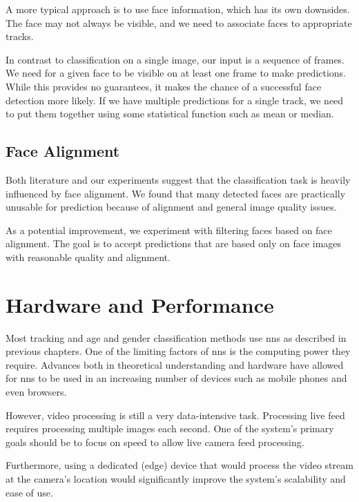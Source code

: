 A more typical approach is to use face information\cite{levi2015age, yang2018ssr, karkkainenfairface}, which has its own downsides. The face may not always be visible, and we need to associate faces to appropriate tracks.

In contrast to classification on a single image, our input is a sequence of frames. We need for a given face to be visible on at least one frame to make predictions. While this provides no guarantees, it makes the chance of a successful face detection more likely. If we have multiple predictions for a single track, we need to put them together using some statistical function such as mean or median.

\subsection{Face Alignment}

Both literature\cite{karkkainenfairface} and our experiments suggest that the classification task is heavily influenced by face alignment. We found that many detected faces are practically unusable for prediction because of alignment and general image quality issues.

As a potential improvement, we experiment with filtering faces based on face alignment. The goal is to accept predictions that are based only on face images with reasonable quality and alignment.

\section{Hardware and Performance}

Most tracking and age and gender classification methods use \glspl{nn} as described in previous chapters. One of the limiting factors of \glspl{nn} is the computing power they require\cite{MOT16, yolo}.  Advances both in theoretical understanding and hardware have allowed for \glspl{nn} to be used in an increasing number of devices such as mobile phones\cite{mobilenets} and even browsers\cite{tfjs}.

However, video processing is still a very data-intensive task. Processing live feed requires processing multiple images each second. One of the system's primary goals should be to focus on speed to allow live camera feed processing.

Furthermore, using a dedicated (edge) device that would process the video stream at the camera's location would significantly improve the system's scalability and ease of use.

